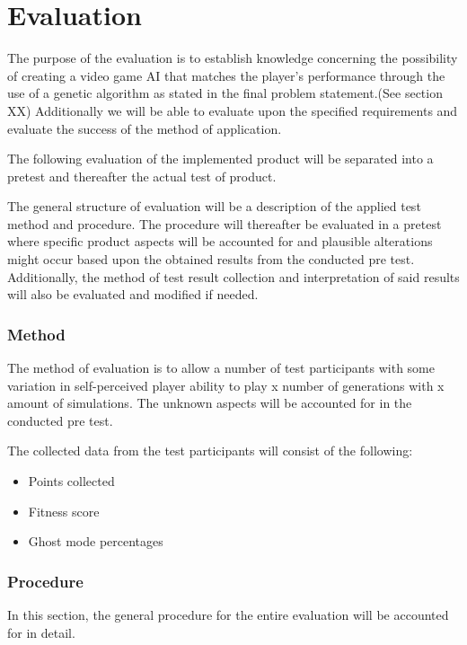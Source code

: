 \section{Evaluation} \label{sec:evaluation}
The purpose of the evaluation is to establish knowledge concerning the possibility of creating a video game AI that matches the player's performance through the use of a genetic algorithm as stated in the final problem statement.(See section XX) Additionally we will be able to evaluate upon the specified requirements and evaluate the success of the method of application.

The following evaluation of the implemented product will be separated into a pretest and thereafter the actual test of product.


The general structure of evaluation will be a description of the applied test method and procedure. The procedure will thereafter be evaluated in a pretest where specific product aspects will be accounted for and plausible alterations might occur based upon the obtained results from the conducted pre test. Additionally, the method of test result collection and interpretation of said results will also be evaluated and modified if needed.


\subsubsection{Method}
The method of evaluation is to allow a number of test participants with some variation in self-perceived player ability to play x number of generations with x amount of simulations. The unknown aspects will be accounted for in the conducted pre test.

The collected data from the test participants will consist of the following:

\begin{itemize}
\item Points collected
\item Fitness score
\item Ghost mode percentages
\end{itemize}



\subsubsection{Procedure}
In this section, the general procedure for the entire evaluation will be accounted for in detail.



